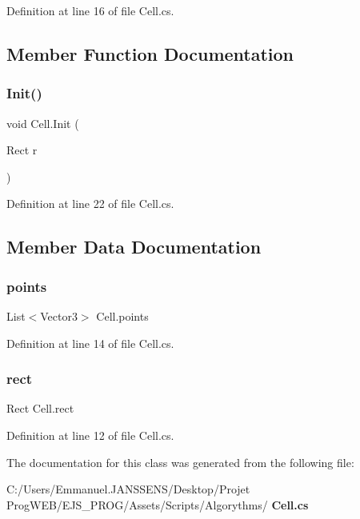Definition at line 16 of file Cell.\+cs.



\subsection{Member Function Documentation}
\mbox{\label{class_cell_af1e5684103367ac1a4f00704638dbe58}} 
\subsubsection{Init()}
{\footnotesize\ttfamily void Cell.\+Init (\begin{DoxyParamCaption}\item[{Rect}]{r }\end{DoxyParamCaption})}



Definition at line 22 of file Cell.\+cs.



\subsection{Member Data Documentation}
\mbox{\label{class_cell_a87e6241981a56e8c608636b413667a0e}} 
\subsubsection{points}
{\footnotesize\ttfamily List$<$Vector3$>$ Cell.\+points}



Definition at line 14 of file Cell.\+cs.

\mbox{\label{class_cell_ae29110b700bb53676f7d1ef43cdbe489}} 
\subsubsection{rect}
{\footnotesize\ttfamily Rect Cell.\+rect}



Definition at line 12 of file Cell.\+cs.



The documentation for this class was generated from the following file\+:\begin{DoxyCompactItemize}
\item 
C\+:/\+Users/\+Emmanuel.\+J\+A\+N\+S\+S\+E\+N\+S/\+Desktop/\+Projet Prog\+W\+E\+B/\+E\+J\+S\+\_\+\+P\+R\+O\+G/\+Assets/\+Scripts/\+Algorythms/\textbf{ Cell.\+cs}\end{DoxyCompactItemize}
